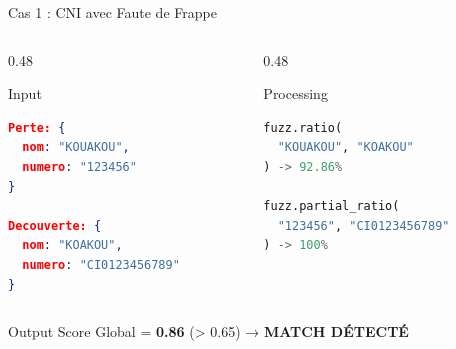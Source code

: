 \documentclass[aspectratio=169]{beamer}
\begin{document}
\begin{frame}[fragile]{Cas 1 : CNI avec Faute de Frappe}
    \begin{columns}[T]
        \begin{column}{0.48\textwidth}
            \begin{block}{Input}
                \small
\begin{lstlisting}[language=json]
Perte: {
  nom: "KOUAKOU",
  numero: "123456"
}

Decouverte: {
  nom: "KOAKOU",
  numero: "CI0123456789"
}
\end{lstlisting}
            \end{block}
        \end{column}
        \begin{column}{0.48\textwidth}
            \begin{block}{Processing}
                \small
\begin{lstlisting}[language=Python]
fuzz.ratio(
  "KOUAKOU", "KOAKOU"
) -> 92.86%

fuzz.partial_ratio(
  "123456", "CI0123456789"
) -> 100%
\end{lstlisting}
            \end{block}
        \end{column}
    \end{columns}

    \vspace{0.3cm}

    \begin{exampleblock}{Output}
        Score Global = \textbf{0.86} (> 0.65) → \textcolor{vertSucces}{\faCheckCircle} \textbf{MATCH DÉTECTÉ}
    \end{exampleblock}
\end{frame}
\end{document}
